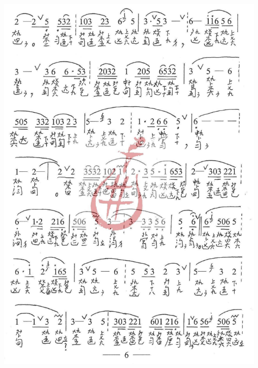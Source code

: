 \documentclass[cn,pad,twocol]{elegantbook}
\begin{document}
\paragraph*{\includegraphics[width=\textwidth]{mudanting/2021-牡丹亭-06惊梦}} 
\end{document}
